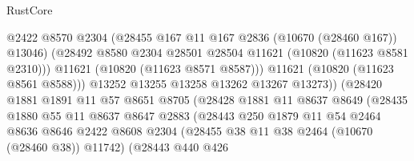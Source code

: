 \begin{lexlean}{RustCore}
\begin{coremodule}
                                        @2422
                                        @8570
                                        @2304
                                        (@28455 @167 @11 @167 @2836 (@10670 (@28460 @167)) @13046)
                                        (@28492
                                          @8580
                                          @2304
                                          @28501
                                          @28504
                                          @11621
                                          (@10820 (@11623 @8581 @2310)))
                                        @11621
                                        (@10820 (@11623 @8571 @8587)))
                                      @11621
                                      (@10820 (@11623 @8561 @8588)))
                                    @13252
                                    @13255
                                    @13258
                                    @13262
                                    @13267
                                    @13273))
                                (@28420
                                  @1881
                                  @1891
                                  @11
                                  @57
                                  @8651
                                  @8705
                                  (@28428
                                    @1881
                                    @11
                                    @8637
                                    @8649
                                    (@28435
                                      @1880
                                      @55
                                      @11
                                      @8637
                                      @8647
                                      @2883
                                      (@28443
                                        @250
                                        @1879
                                        @11
                                        @54
                                        @2464
                                        @8636
                                        @8646
                                        @2422
                                        @8608
                                        @2304
                                        (@28455 @38 @11 @38 @2464 (@10670 (@28460 @38)) @11742)
                                        (@28443
                                          @440
                                          @426

\end{coremodule}
\end{lexlean}

